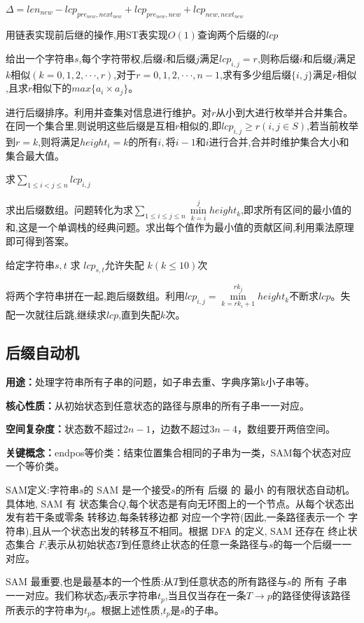 \documentclass[a4paper, fontset=none]{ctexart}
\begin{document}
$\Delta=len_{new}-lcp_{pre_{new}, next_{new}}+lcp_{pre_{new}, new}+lcp_{new, next_{new}}$ 

用链表实现前后继的操作,用ST表实现$O(1)$查询两个后缀的$lcp$

给出一个字符串$s$,每个字符带权,后缀$i$和后缀$j$满足$lcp_{i, j}=r$,则称后缀$i$和后缀$j$满足$k相似(k=0, 1, 2,···, r)$,对于$r=0, 1, 2,···, n-1$,求有多少组后缀$\{i, j\}$满足$r相似$,且求$r相似下的$$max\{a_i\times a_j\}$。

进行后缀排序。利用并查集对信息进行维护。对$r$从小到大进行枚举并合并集合。在同一个集合里,则说明这些后缀是互相$r相似的$,即$lcp_{i, j}\ge r(i, j\in S)$,若当前枚举到$r=k$,则将满足$height_i=k的所有i,将i-1和i进行合并$,合并时维护集合大小和集合最大值。

求$\sum\limits_{1\leqslant i < j\leqslant n}lcp_{i, j}$

求出后缀数组。问题转化为求$\sum\limits_{1\leqslant i\leqslant j\leqslant n}\min\limits_{k=i}^jheight_{k}$,即求所有区间的最小值的和,这是一个单调栈的经典问题。求出每个值作为最小值的贡献区间,利用乘法原理即可得到答案。

给定字符串$s, t$ 求 $lcp_{s, t}$允许失配 $k(k\leqslant 10)$次

将两个字符串拼在一起,跑后缀数组。利用$lcp_{i, j}=\min\limits_{k=rk_i+1}^{rk_j}height_k$不断求$lcp$。失配一次就往后跳,继续求$lcp$,直到失配$k$次。
\subsection{后缀自动机}
\textbf{用途：}处理字符串所有子串的问题，如子串去重、字典序第k小子串等。

\textbf{核心性质：}从初始状态到任意状态的路径与原串的所有子串一一对应。

\textbf{空间复杂度：}状态数不超过$2n-1$，边数不超过$3n-4$，数组要开两倍空间。

\textbf{关键概念：}endpos等价类：结束位置集合相同的子串为一类，SAM每个状态对应一个等价类。

SAM定义:字符串$s$的 SAM 是一个接受$s$的所有 后缀 的 最小 的有限状态自动机。具体地, SAM 有 状态集合$Q$,每个状态是有向无环图上的一个节点。从每个状态出发有若干条或零条 转移边,每条转移边都 对应一个字符(因此,一条路径表示一个 字符串),且从一个状态出发的转移互不相同。根据 DFA 的定义, SAM 还存在 终止状态集合 $F$,表示从初始状态$T$到任意终止状态的任意一条路径与$s$的每一个后缀一一对应。

SAM 最重要,也是最基本的一个性质:从$T$到任意状态的所有路径与$s$的 所有 子串 一一对应。我们称状态$p$表示字符串$t_p$,当且仅当存在一条$T\rightarrow p$的路径使得该路径所表示的字符串为$t_p$。根据上述性质,$t_p$是$s$的子串。
\end{document}
